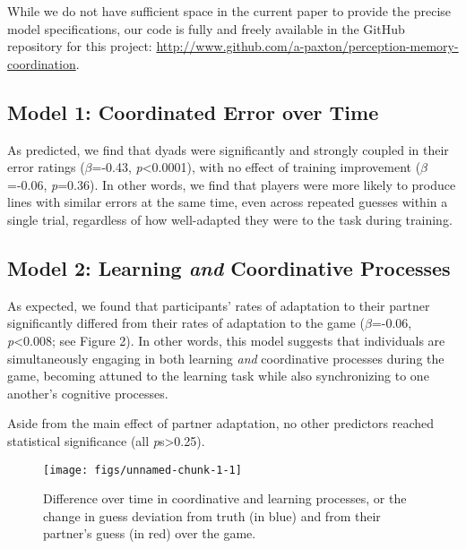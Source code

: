 \documentclass[10pt, letterpaper]{article}
\newenvironment{CodeChunk}{}{}
\begin{document}
While we do not have sufficient space in the current paper to provide
the precise model specifications, our code is fully and freely available
in the GitHub repository for this project:
\url{http://www.github.com/a-paxton/perception-memory-coordination}.

\subsection{Model 1: Coordinated Error over
Time}\label{model-1-coordinated-error-over-time-1}

As predicted, we find that dyads were significantly and strongly coupled
in their error ratings (\emph{\(\beta\)}=-0.43,
\emph{p}\textless{}0.0001), with no effect of training improvement
(\emph{\(\beta\)}=-0.06, \emph{p}=0.36). In other words, we find that
players were more likely to produce lines with similar errors at the
same time, even across repeated guesses within a single trial,
regardless of how well-adapted they were to the task during training.

\subsection{\texorpdfstring{Model 2: Learning \emph{and} Coordinative
Processes}{Model 2: Learning and Coordinative Processes}}\label{model-2-learning-and-coordinative-processes-1}

As expected, we found that participants' rates of adaptation to their
partner significantly differed from their rates of adaptation to the
game (\emph{\(\beta\)}=-0.06, \emph{p}\textless{}0.008; see Figure 2).
In other words, this model suggests that individuals are simultaneously
engaging in both learning \emph{and} coordinative processes during the
game, becoming attuned to the learning task while also synchronizing to
one another's cognitive processes.

Aside from the main effect of partner adaptation, no other predictors
reached statistical significance (all \emph{p}s\textgreater{}0.25).

\begin{CodeChunk}
\begin{figure}[H]

\texttt{[image: figs/unnamed-chunk-1-1]} \hfill{}

\caption[Difference over time in coordinative and learning processes, or the change in guess deviation from truth (in blue) and from their partner's guess (in red) over the game]{Difference over time in coordinative and learning processes, or the change in guess deviation from truth (in blue) and from their partner's guess (in red) over the game.}\label{fig:unnamed-chunk-1}
\end{figure}
\end{CodeChunk}
\end{document}
